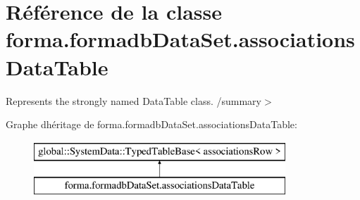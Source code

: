 \hypertarget{classforma_1_1formadb_data_set_1_1associations_data_table}{}\section{Référence de la classe forma.\+formadb\+Data\+Set.\+associations\+Data\+Table}
\label{classforma_1_1formadb_data_set_1_1associations_data_table}


Represents the strongly named Data\+Table class. /summary$>$  


Graphe d\textquotesingle{}héritage de forma.\+formadb\+Data\+Set.\+associations\+Data\+Table\+:\begin{figure}[H]
\begin{center}
\leavevmode
\includegraphics[height=2.000000cm]{classforma_1_1formadb_data_set_1_1associations_data_table}
\end{center}
\end{figure}
